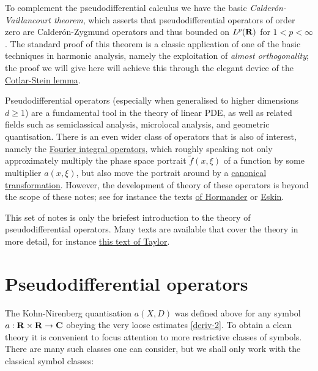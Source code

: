 \documentclass[11pt]{article}
\theoremstyle{definition}
\begin{document}
To complement the pseudodifferential calculus we have the basic \emph{Calderón-Vaillancourt theorem}, which asserts that pseudodifferential operators of order zero are Calderón-Zygmund operators and thus bounded on \({L^p({\bf R})}\) for \({1 < p < \infty}\). The standard proof of this theorem is a classic application of one of the basic techniques in harmonic analysis, namely the exploitation of \emph{almost orthogonality}; the proof we will give here will achieve this through the elegant device of the \href{https://en.wikipedia.org/wiki/Cotlar%E2%80%93Stein_lemma}{Cotlar-Stein lemma}.


Pseudodifferential operators (especially when generalised to higher dimensions \({d \geq 1}\)) are a fundamental tool in the theory of linear PDE, as well as related fields such as semiclassical analysis, microlocal analysis, and geometric quantisation. There is an even wider class of operators that is also of interest, namely the \href{https://en.wikipedia.org/wiki/Fourier_integral_operator}{Fourier integral operators}, which roughly speaking not only approximately multiply the phase space portrait \({\tilde f(x,\xi)}\) of a function by some multiplier \({a(x,\xi)}\), but also move the portrait around by a \href{https://en.wikipedia.org/wiki/Canonical_transformation}{canonical transformation}. However, the development of theory of these operators is beyond the scope of these notes; see for instance the texts \href{https://mathscinet.ams.org/mathscinet-getitem?mr=1481433}{of Hormander} or \href{https://mathscinet.ams.org/mathscinet-getitem?mr=2809923}{Eskin}.


This set of notes is only the briefest introduction to the theory of pseudodifferential operators. Many texts are available that cover the theory in more detail, for instance \href{https://mathscinet.ams.org/mathscinet-getitem?mr=1766415}{this text of Taylor}.




\section{Pseudodifferential operators}

The Kohn-Nirenberg quantisation \({a(X,D)}\) was defined above for any symbol \({a: {\bf R} \times {\bf R} \rightarrow {\bf C}}\) obeying the very loose estimates \eqref{deriv-2}. To obtain a clean theory it is convenient to focus attention to more restrictive classes of symbols. There are many such classes one can consider, but we shall only work with the classical symbol classes:
\end{document}
